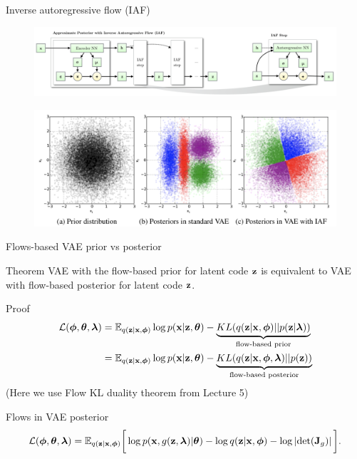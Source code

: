 \begin{frame}{Inverse autoregressive flow (IAF)}
	\begin{figure}
		\includegraphics[width=\linewidth]{figs/iaf2.png}
	\end{figure}
	\begin{figure}
		\includegraphics[width=\linewidth]{figs/iaf1.png}
	\end{figure}

\end{frame}
\begin{frame}{Flows-based VAE prior vs posterior}
	\begin{block}{Theorem}
	VAE with the flow-based prior for latent code $\mathbf{z}$ is equivalent to VAE with flow-based posterior for latent code $\mathbf{z}$.
	\end{block}
	\begin{block}{Proof}
	\vspace{-0.5cm}
	\begin{align*}
		\mathcal{L}(\boldsymbol{\phi}, \boldsymbol{\theta}, \boldsymbol{\lambda}) &= \mathbb{E}_{q(\mathbf{z} | \mathbf{x}, \boldsymbol{\phi})} \log p(\mathbf{x} | \mathbf{z}, \boldsymbol{\theta}) - \underbrace{KL( q(\mathbf{z} | \mathbf{x}, \boldsymbol{\phi}) || p(\mathbf{z} | \boldsymbol{\lambda}))}_{\text{flow-based prior}} \\
		& = \mathbb{E}_{q(\mathbf{z} | \mathbf{x}, \boldsymbol{\phi})} \log p(\mathbf{x} | \mathbf{z}, \boldsymbol{\theta}) - \underbrace{KL( q(\mathbf{z} | \mathbf{x}, \boldsymbol{\phi}, \boldsymbol{\lambda}) || p(\mathbf{z}))}_{\text{flow-based posterior}}
	\end{align*}
	(Here we use Flow KL duality theorem from Lecture 5)
	\end{block}
	\begin{block}{Flows in VAE posterior}
		\vspace{-0.3cm}
		{\small
		\[
			\mathcal{L} (\boldsymbol{\phi}, \boldsymbol{\theta}, \boldsymbol{\lambda}) 
			= \mathbb{E}_{q(\mathbf{z} | \mathbf{x}, \boldsymbol{\phi})} \bigg[\log p(\mathbf{x}, g(\mathbf{z}, \boldsymbol{\lambda}) | \boldsymbol{\theta}) -  \log q(\mathbf{z} | \mathbf{x}, \boldsymbol{\phi} ) -  \log \left| \det (\mathbf{J}_g) \right| \bigg].
		\]
		}
	\end{block}
\end{frame}
